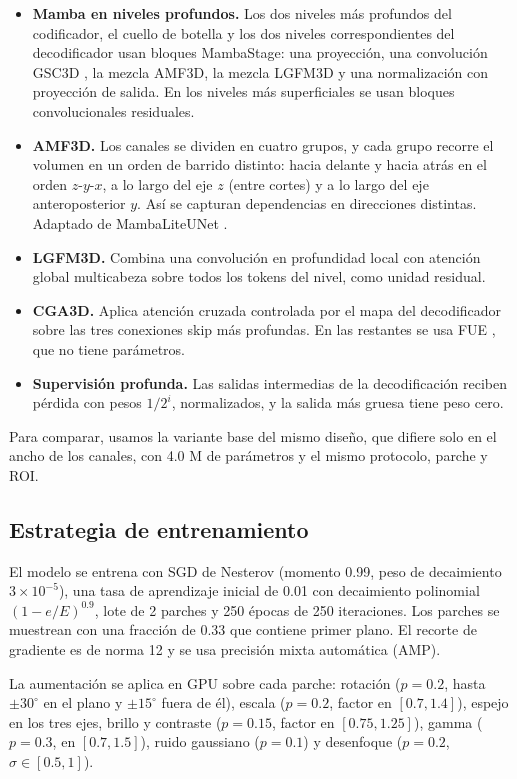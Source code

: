 \documentclass[conference]{IEEEtran}
\begin{document}
\begin{itemize}
    \item \textbf{Mamba en niveles profundos.} Los dos niveles más profundos del codificador, el cuello de botella y los dos niveles correspondientes del decodificador usan bloques MambaStage: una proyección, una convolución GSC3D \cite{xing2024segmamba}, la mezcla AMF3D, la mezcla LGFM3D y una normalización con proyección de salida. En los niveles más superficiales se usan bloques convolucionales residuales.
    \item \textbf{AMF3D.} Los canales se dividen en cuatro grupos, y cada grupo recorre el volumen en un orden de barrido distinto: hacia delante y hacia atrás en el orden $z$-$y$-$x$, a lo largo del eje $z$ (entre cortes) y a lo largo del eje anteroposterior $y$. Así se capturan dependencias en direcciones distintas. Adaptado de MambaLiteUNet \cite{rahman2026mambalite}.
    \item \textbf{LGFM3D.} Combina una convolución en profundidad local con atención global multicabeza sobre todos los tokens del nivel, como unidad residual.
    \item \textbf{CGA3D.} Aplica atención cruzada controlada por el mapa del decodificador sobre las tres conexiones skip más profundas. En las restantes se usa FUE \cite{xing2024segmamba}, que no tiene parámetros.
    \item \textbf{Supervisión profunda.} Las salidas intermedias de la decodificación reciben pérdida con pesos $1/2^i$, normalizados, y la salida más gruesa tiene peso cero.
\end{itemize}

Para comparar, usamos la variante base del mismo diseño, que difiere solo en el ancho de los canales, con 4.0 M de parámetros y el mismo protocolo, parche y ROI.

\subsection{Estrategia de entrenamiento}

El modelo se entrena con SGD de Nesterov (momento 0.99, peso de decaimiento $3 \times 10^{-5}$), una tasa de aprendizaje inicial de 0.01 con decaimiento polinomial $(1 - e/E)^{0.9}$, lote de 2 parches y 250 épocas de 250 iteraciones. Los parches se muestrean con una fracción de 0.33 que contiene primer plano. El recorte de gradiente es de norma 12 y se usa precisión mixta automática (AMP).

La aumentación se aplica en GPU sobre cada parche: rotación ($p = 0.2$, hasta $\pm 30^\circ$ en el plano y $\pm 15^\circ$ fuera de él), escala ($p = 0.2$, factor en $[0.7, 1.4]$), espejo en los tres ejes, brillo y contraste ($p = 0.15$, factor en $[0.75, 1.25]$), gamma ($p = 0.3$, en $[0.7, 1.5]$), ruido gaussiano ($p = 0.1$) y desenfoque ($p = 0.2$, $\sigma \in [0.5, 1]$).
\end{document}
